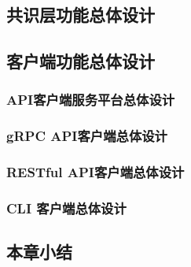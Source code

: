    \subsection{共识层功能总体设计}	

    \subsection{客户端功能总体设计}
	
        \subsubsection{API客户端服务平台总体设计}
        \subsubsection{gRPC API客户端总体设计}
        \subsubsection{RESTful API客户端总体设计}       
        \subsubsection{CLI 客户端总体设计}
	
    \subsection{本章小结}

\clearpage